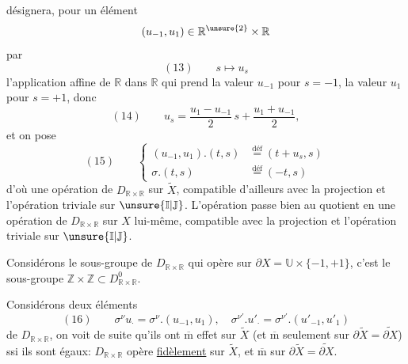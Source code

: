 désignera, pour un élément
\[
(u_{-1},u_1)\in\mathbb R^{\unsure{2}}\times\mathbb R
\]
par
\[
(13)\qquad s\longmapsto u_s
\]
l'application affine de $\mathbb R$ dans $\mathbb R$  qui prend la valeur $u_{-1}$ pour $s=-1$, la valeur $u_1$ pour $s=+1$,  donc
\[
(14)\qquad u_s=\frac{u_1-u_{-1}}2\,s+\frac{u_1+u_{-1}}2,
\]
et on pose
\[
(15)\qquad\left\{\begin{aligned}
(u_{-1},u_1).(t,s)&\overset{\mathrm{déf}}{=}(t+u_s,s)\\
\sigma.(t,s)&\overset{\mathrm{déf}}{=}(-t,s)
\end{aligned}\right.
\]
d'où une opération de $D_{\mathbb R\times\mathbb R}$ sur $\widetilde X$, compatible d'ailleurs avec la  projection
et l'opération triviale sur $\unsure{\mathbb I|\mathbb J}$. L'opération passe bien au quotient en une opération de $D_{\mathbb R\times\mathbb R}$ sur $X$ lui-même, compatible avec la projection
et l'opération triviale sur $\unsure{\mathbb I|\mathbb J}$.

Considérons le sous-groupe de $D_{\mathbb R\times\mathbb R}$ qui opère  sur $\partial X=\mathbb U\times\{-1,+1\}$, c'est le sous-groupe $\mathbb Z\times\mathbb Z\subset D_{\mathbb R\times\mathbb R}^{0}$.


Considérons deux éléments
\[
(16)\qquad \sigma^\nu u_\cdot=\sigma^\nu.(u_{-1},u_1),\quad\sigma^{\nu'}.u'_\cdot=\sigma^{\nu'}.(u'_{-1},u'_1)
\]
de $D_{\mathbb R\times\mathbb R}$, on voit de suite qu'ils ont $\overline{\mathrm m}$ effet sur $\widetilde X$  (et $\overline{\mathrm m}$ seulement sur $\partial\widetilde X=\widetilde{\partial X}$) ssi ils sont égaux: $D_{\mathbb R\times\mathbb R}$ opère \uline{fidèlement} sur $\widetilde X$, et $\overline{\mathrm m}$ sur $\partial\widetilde X=\widetilde{\partial X}$.

